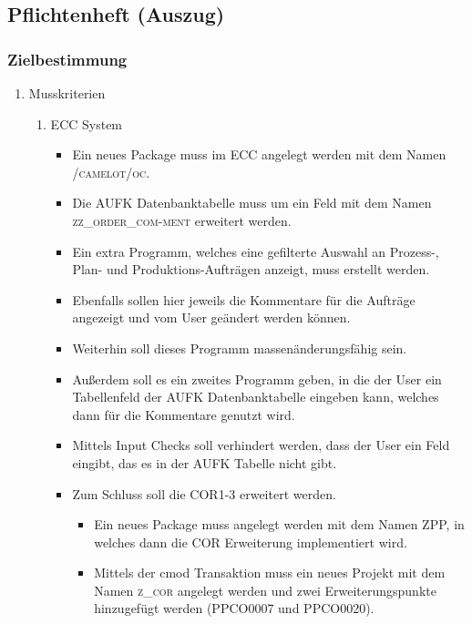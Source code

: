 \subsection{Pflichtenheft (Auszug)}
\label{app:Pflichtenheft}

\subsubsection*{Zielbestimmung}

\begin{enumerate}[itemsep=0em,partopsep=0em,parsep=0em,topsep=0em]
\item Musskriterien %
	\begin{enumerate}
	\item ECC System
		\begin{itemize}
		\item Ein neues Package muss im ECC angelegt werden mit dem Namen \textsc{/camelot/oc}.
		\item Die AUFK Datenbanktabelle muss um ein Feld mit dem Namen \textsc{zz\_order\_com-ment} erweitert werden.
		\item Ein extra Programm, welches eine gefilterte Auswahl an Prozess-, Plan- und Produktions-Aufträgen anzeigt, muss erstellt werden.
		\item Ebenfalls sollen hier jeweils die Kommentare für die Aufträge angezeigt und vom User geändert werden können. 
		\item Weiterhin soll dieses Programm massenänderungsfähig sein. 
		\item Außerdem soll es ein zweites Programm geben, in die der User ein Tabellenfeld der AUFK Datenbanktabelle eingeben kann, welches dann für die Kommentare genutzt wird.
		\item Mittels Input Checks soll verhindert werden, dass der User ein Feld eingibt, das es in der AUFK Tabelle nicht gibt.
		\item Zum Schluss soll die COR1-3 erweitert werden.
		\begin{itemize}
			\item Ein neues Package muss angelegt werden mit dem Namen ZPP, in welches dann die COR Erweiterung implementiert wird.
			\item Mittels der cmod Transaktion muss ein neues Projekt mit dem Namen \textsc{z\_cor} angelegt werden und zwei Erweiterungspunkte hinzugefügt werden (PPCO0007 und PPCO0020).
		\end{itemize}

\end{itemize}
\end{enumerate}
\end{enumerate}
